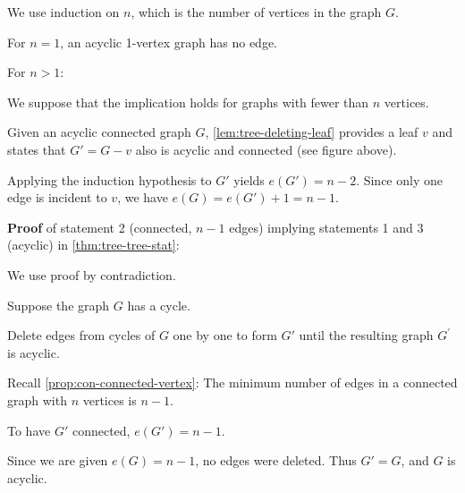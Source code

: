 \documentclass[../src/handouts/main.tex]{subfiles}
\begin{document}
\begin{enumerate*}
  \vspace{-.25em} %
  \item We use induction on $n$, which is the number of vertices in the graph $G$.
  \item For $n = 1$, an acyclic 1-vertex graph has no edge.
  \item For $n > 1$:
        \vspace{.5em}
        \begin{enumerate*}
          \item We suppose that the implication holds for graphs with fewer than $n$ vertices.
          \item Given an acyclic connected graph $G$, \cref{lem:tree-deleting-leaf} provides a leaf $v$ and states that $G' = G - v$ also is acyclic and connected (see figure above).
          \item Applying the induction hypothesis to $G'$ yields $e \left( G' \right) = n - 2$. Since only one edge is incident to $v$, we have $e(G) = e \left( G' \right) + 1 = n - 1$.
        \end{enumerate*}
        \vspace{.25em} %
\end{enumerate*}
\vspace{.5em} %

\textbf{Proof} of statement 2 (connected, $n - 1$ edges) implying statements 1 and 3 (acyclic) in \cref{thm:tree-tree-stat}:
\begin{enumerate*}
  \item We use proof by contradiction.
  \item Suppose the graph $G$ has a cycle.
  \item Delete edges from cycles of $G$ one by one to form $G'$ until the resulting graph $G^{\prime}$ is acyclic. 
  \item Recall \cref{prop:con-connected-vertex}: The minimum number of edges in a connected graph with $n$ vertices is $n - 1$.
  \item To have $G'$ connected, $e\left( G' \right) = n - 1$.
  \item Since we are given $e(G) = n - 1$, no edges were deleted. Thus $G' = G$, and $G$ is acyclic.
\end{enumerate*}
\vspace{.5em} %
\end{document}
